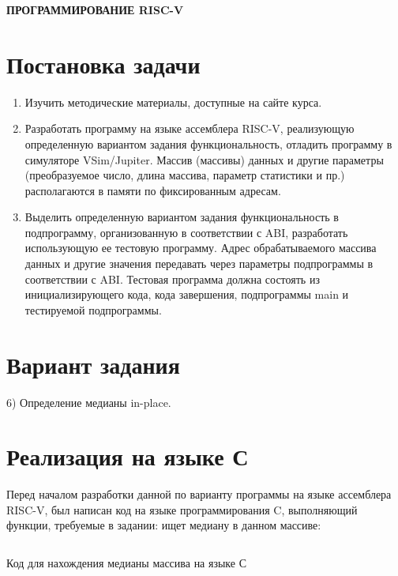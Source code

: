 \begin{center}
	\Large\textbf{\MakeUppercase{Программирование RISC-V}}
\end{center}

\section{Постановка задачи}
\begin{enumerate}
	\item Изучить методические материалы, доступные на сайте курса.
	\item Разработать программу на языке ассемблера RISC-V, реализующую определенную вариантом задания функциональность, отладить программу в симуляторе VSim/Jupiter. Массив (массивы) данных и другие параметры (преобразуемое число, длина массива, параметр статистики и пр.) располагаются в памяти по фиксированным адресам.
	\item Выделить определенную вариантом задания функциональность в подпрограмму, организованную в соответствии с ABI, разработать использующую ее тестовую программу. Адрес обрабатываемого массива данных и другие значения передавать через параметры подпрограммы в соответствии с ABI. Тестовая программа должна состоять из инициализирующего кода, кода завершения, подпрограммы main и тестируемой подпрограммы.
\end{enumerate}

\section{Вариант задания}
6) Определение медианы in-place.

\newpage

\section{Реализация на языке С}

Перед началом разработки данной по варианту программы на языке ассемблера RISC-V, был написан код на языке программирования C, выполняющий функции, требуемые в задании: ищет медиану в данном массиве:

\begin{code}
	\inputminted[breaklines=true, xleftmargin=1em, linenos, frame=single, framesep=10pt, fontsize=\footnotesize, firstline=1, lastline=33]{c}{listings/median.c}
	\caption{Код для нахождения медианы массива на языке С}
\end{code}

